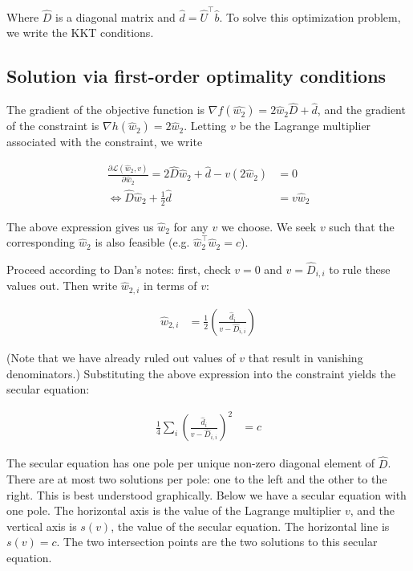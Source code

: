 \documentclass{article}
\begin{document}
Where $\hat{D}$ is a diagonal matrix and
$\hat{d} = \hat{U}^\top\hat{b}$. To solve this optimization problem, we
write the KKT conditions.

    \subsection{Solution via first-order optimality
conditions}\label{solution-via-first-order-optimality-conditions}

The gradient of the objective function is
$\nabla f(\hat{w_2}) =  2\hat{w}_2\hat{D} + \hat{d}$, and the gradient
of the constraint is $\nabla h(\hat{w}_2) = 2\hat{w}_2$. Letting $v$ be
the Lagrange multiplier associated with the constraint, we write

\begin{align}
\frac{\partial \mathcal{L}(\hat{w}_2,v)}{\partial \hat{w}_2} = 2\hat{D}\hat{w}_2 + \hat{d} - v(2\hat{w}_2) &= 0 \\
\iff \hat{D}\hat{w}_2 + \frac{1}{2}\hat{d} &= v\hat{w}_2
\end{align}

The above expression gives us $\hat{w}_2$ for any $v$ we choose. We seek
$v$ such that the corresponding $\hat{w}_2$ is also feasible (e.g.
$\hat{w}_2^\top \hat{w}_2 = c$).

Proceed according to Dan's notes: first, check $v=0$ and
$v=\hat{D}_{i,i}$ to rule these values out. Then write $\hat{w}_{2,i}$
in terms of $v$:

\begin{align}
\hat{w}_{2,i} &= \frac{1}{2}\left(\frac{\hat{d}_i}{v - \hat{D}_{i,i}}\right)
\end{align}

(Note that we have already ruled out values of $v$ that result in
vanishing denominators.) Substituting the above expression into the
constraint yields the secular equation:

\begin{align}
\frac{1}{4} \sum_{i}\left( \frac{\hat{d}_i}{v - \hat{D}_{i,i}}\right)^2 &= c
\end{align}

The secular equation has one pole per unique non-zero diagonal element
of $\hat{D}$. There are at most two solutions per pole: one to the left
and the other to the right. This is best understood graphically. Below
we have a secular equation with one pole. The horizontal axis is the
value of the Lagrange multiplier $v$, and the vertical axis is $s(v)$,
the value of the secular equation. The horizontal line is $s(v)=c$. The
two intersection points are the two solutions to this secular equation.

    


    
    
    
    
\end{document}
